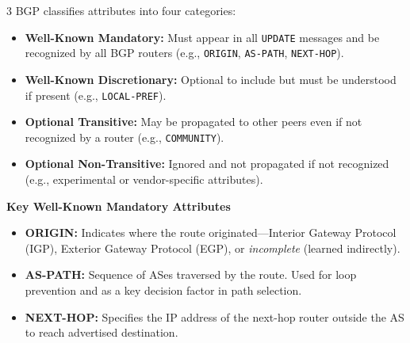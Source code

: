 \documentclass[a4paper, 9pt, landscape]{article}
\begin{document}
\begin{multicols*}{3}
BGP classifies attributes into four categories:
\begin{itemize}
    \item \textbf{Well-Known Mandatory:} Must appear in all \texttt{UPDATE} messages and be recognized by all BGP routers (e.g., \texttt{ORIGIN}, \texttt{AS-PATH}, \texttt{NEXT-HOP}).
    \item \textbf{Well-Known Discretionary:} Optional to include but must be understood if present (e.g., \texttt{LOCAL-PREF}).
    \item \textbf{Optional Transitive:} May be propagated to other peers even if not recognized by a router (e.g., \texttt{COMMUNITY}).
    \item \textbf{Optional Non-Transitive:} Ignored and not propagated if not recognized (e.g., experimental or vendor-specific attributes).
\end{itemize}

\textbf{Key Well-Known Mandatory Attributes}
\begin{itemize}
    \item \textbf{ORIGIN:} Indicates where the route originated—Interior Gateway Protocol (IGP), Exterior Gateway Protocol (EGP), or \textit{incomplete} (learned indirectly).
    \item \textbf{AS-PATH:}  Sequence of ASes traversed by the route. Used for loop prevention and as a key decision factor in path selection.
    \item \textbf{NEXT-HOP:} Specifies the IP address of the next-hop router outside the AS to reach advertised destination. 
\end{itemize}



\end{multicols*}
\end{document}
